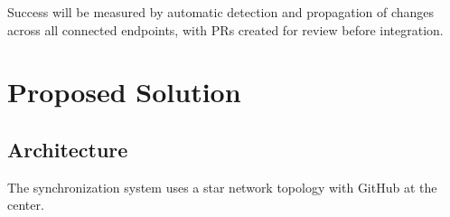 \documentclass[letterpaper,10pt,openany,oneside,english]{sphinxmanual}
\begin{document}
\sphinxAtStartPar
Success will be measured by automatic detection and propagation of changes across
all connected endpoints, with PRs created for review before integration.

\sphinxstepscope


\section{Proposed Solution}
\label{\detokenize{proposed_solution:proposed-solution}}\label{\detokenize{proposed_solution::doc}}

\subsection{Architecture}
\label{\detokenize{proposed_solution:architecture}}
\sphinxAtStartPar
The synchronization system uses a star network topology with GitHub at the center.
\end{document}
